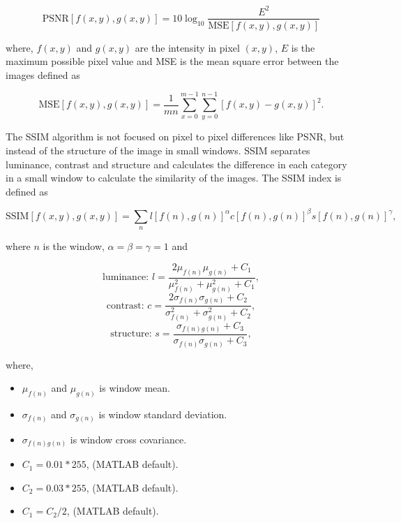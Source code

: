 \begin{equation}
    \text{PSNR}[f(x,y),g(x,y)] = 10 \log_{10}\frac{E^2}{\text{MSE}[f(x,y),g(x,y)]}
\end{equation}
 
where, $f(x,y)$ and $g(x,y)$ are the intensity in pixel $(x,y)$, $E$ is the maximum possible pixel value and MSE is the mean square error between the images defined as

\begin{equation}
\text{MSE}[f(x,y),g(x,y)] = \frac{1}{mn}\sum_{x=0}^{m-1}\sum_{y=0}^{n-1}[f(x,y) - g(x,y)]^2.
\end{equation}

The SSIM algorithm is not focused on pixel to pixel differences like PSNR, but instead of the structure of the image in small windows. SSIM separates  luminance, contrast and structure and calculates the difference in each category in a small window to calculate the similarity of the images. The SSIM index is defined as

\begin{equation}
\text{SSIM}[f(x,y),g(x,y)] = \sum_nl[f(n),g(n)]^\alpha c[f(n),g(n)]^\beta s[f(n),g(n)]^\gamma ,
\end{equation}

where $n$ is the window, $\alpha=\beta=\gamma = 1$ and 

\begin{equation}
\displaystyle \text{luminance: } l = \frac{2\mu_{f(n)}\mu_{g(n)} + C_1}{\mu_{f(n)}^2 + \mu_{g(n)}^2 + C_1},
\end{equation}
\begin{equation}
\text{contrast: } c = \frac{2\sigma_{f(n)}\sigma_{g(n)} + C_2}{\sigma_{f(n)}^2 + \sigma_{g(n)}^2 + C_2},
\end{equation}
\begin{equation}
\text{structure: } s = \frac{\sigma_{f(n)g(n)} + C_3}{\sigma_{f(n)} \sigma_{g(n)} + C_3},
\end{equation}

where,

\begin{itemize}
\item $\mu_{f(n)}$ and $\mu_{g(n)}$ is window mean.
\item $\sigma_{f(n)}$ and $\sigma_{g(n)}$ is window standard deviation.
\item $\sigma_{f(n)g(n)}$ is window cross covariance.
\item $C_1 = 0.01*255$, (MATLAB default).
\item $C_2 = 0.03*255$, (MATLAB default).
\item $C_1 = C_2/2$, (MATLAB default).
\end{itemize} 

